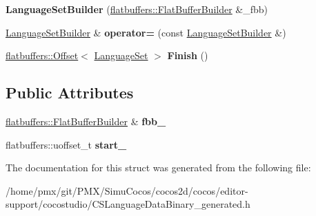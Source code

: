 \begin{DoxyCompactItemize}
{\bfseries Language\+Set\+Builder} (\hyperlink{classflatbuffers_1_1FlatBufferBuilder}{flatbuffers\+::\+Flat\+Buffer\+Builder} \&\+\_\+fbb)
\item 
\mbox{\label{structflatbuffers_1_1LanguageSetBuilder_a25d0acf25586b28483ee3003cdf5f0df}} 
\hyperlink{structflatbuffers_1_1LanguageSetBuilder}{Language\+Set\+Builder} \& {\bfseries operator=} (const \hyperlink{structflatbuffers_1_1LanguageSetBuilder}{Language\+Set\+Builder} \&)
\item 
\mbox{\label{structflatbuffers_1_1LanguageSetBuilder_a33c0d9c400ab68358874ba4f5bad4af0}} 
\hyperlink{structflatbuffers_1_1Offset}{flatbuffers\+::\+Offset}$<$ \hyperlink{structflatbuffers_1_1LanguageSet}{Language\+Set} $>$ {\bfseries Finish} ()
\end{DoxyCompactItemize}
\subsection*{Public Attributes}
\begin{DoxyCompactItemize}
\item 
\mbox{\label{structflatbuffers_1_1LanguageSetBuilder_aaa93f2d41d070cbfaff7767365e798ca}} 
\hyperlink{classflatbuffers_1_1FlatBufferBuilder}{flatbuffers\+::\+Flat\+Buffer\+Builder} \& {\bfseries fbb\+\_\+}
\item 
\mbox{\label{structflatbuffers_1_1LanguageSetBuilder_a2a746bc414203bd5f10cc37ec8544e6f}} 
flatbuffers\+::uoffset\+\_\+t {\bfseries start\+\_\+}
\end{DoxyCompactItemize}


The documentation for this struct was generated from the following file\+:\begin{DoxyCompactItemize}
\item 
/home/pmx/git/\+P\+M\+X/\+Simu\+Cocos/cocos2d/cocos/editor-\/support/cocostudio/C\+S\+Language\+Data\+Binary\+\_\+generated.\+h\end{DoxyCompactItemize}
